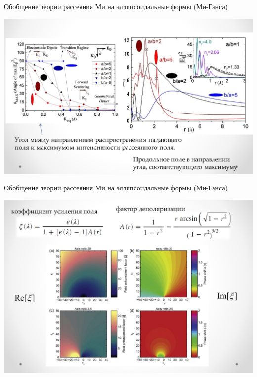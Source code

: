 \documentclass[9pt, compress, xcolor=table]{beamer}
\begin{document}
\begin{frame}{Обобщение теории рассеяния Ми на эллипсоидальные формы (Ми-Ганса)}

\begin{center}
\includegraphics[width=1.1\textwidth]{add_sl4}
\end{center}

\end{frame}

\begin{frame}{Обобщение теории рассеяния Ми на эллипсоидальные формы (Ми-Ганса)}

\begin{center}
\includegraphics[width=1.1\textwidth]{add_sl5}
\end{center}
  
\end{frame}
\end{document}
